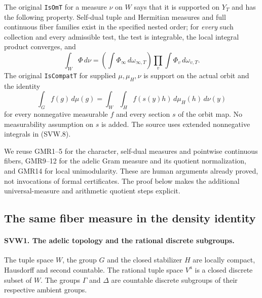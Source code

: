 The original \texttt{IsOmT} for a measure $\nu$ on $W$ says that it is
supported on $Y_T$ and has the following property.  Self-dual tuple
and Hermitian measures and full continuous fiber families exist in
the specified nested order; for \emph{every} such collection and every
admissible test, the test is integrable, the local integral product
converges, and
\[
 \int_W\Phi\,d\nu
   =\left(\int\Phi_\infty\,d\omega_{\infty,T}\right)
      \prod_v\int\Phi_v\,d\omega_{v,T}.
 \tag{SVW.7}
\]
The original \texttt{IsCompatT} for supplied $\mu,\mu_H,\nu$ is
support on the actual orbit and the identity
\[
 \int_G f(g)\,d\mu(g)
   =\int_W\int_H f(s(y)h)\,d\mu_H(h)\,d\nu(y)
 \tag{SVW.8}
\]
for every nonnegative measurable $f$ and every section $s$ of the
orbit map.  No measurability assumption on $s$ is added.  The source
uses extended nonnegative integrals in (SVW.8).

We reuse GMR1--5 for the character, self-dual measures and pointwise
continuous fibers, GMR9--12 for the adelic Gram measure and its
quotient normalization, and GMR14 for local unimodularity.  These are
human arguments already proved, not invocations of formal certificates.
The proof below makes the additional universal-measure and arithmetic
quotient steps explicit.

\subsection{The same fiber measure in the density identity}

\paragraph{SVW1. The adelic topology and the rational discrete subgroups.}
\label{claim:SVW1}
The tuple space $W$, the group $G$ and the closed stabilizer $H$ are
locally compact, Hausdorff and second countable.  The rational tuple
space $V^a$ is a closed discrete subset of $W$.  The groups $\Gamma$
and $\Delta$ are countable discrete subgroups of their respective
ambient groups.

